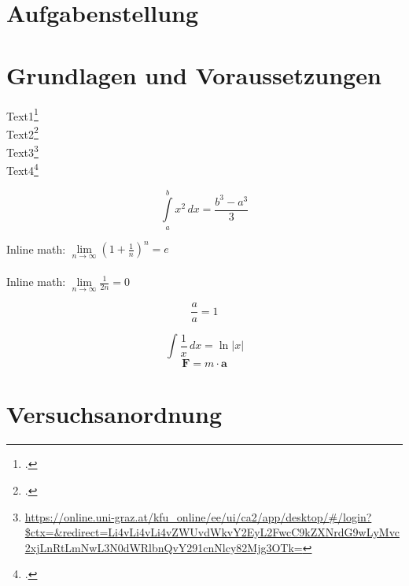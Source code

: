 \documentclass[11pt, DIV=8, ngerman]{scrartcl}
\begin{document}


\clearpage
\tableofcontents
\newpage

\section{Aufgabenstellung}
\label{sec:aufgabenstellung}



\section{Grundlagen und Voraussetzungen}
\label{sec:grundlagen_voraussetzungen}

Text1\footcite[1000]{ref:dem1} \\
Text2\footcite[Kapitel 74]{ref:knoll} \\
Text3\footnote{\url{https://online.uni-graz.at/kfu_online/ee/ui/ca2/app/desktop/\#/login?$ctx=&redirect=Li4vLi4vLi4vZWUvdWkvY2EyL2FwcC9kZXNrdG9wLyMvc2xjLnRtLmNwL3N0dWRlbnQvY291cnNlcy82Mjg3OTk=}} \\  %
Text4\footcite{ref:genol2013}

\begin{equation}
\label{eq:grenzen-oben-unten}
    \int \limits_{a}^{b} x^2 \, dx =\frac{b^3-a^3}{3}  %
\end{equation}

Inline math: \(\lim \limits_{n \to \infty} \left( 1 + \frac{1}{n} \right) ^{n} = e\)  \\ \\ %
Inline math: $\lim \limits_{n \to \infty} \frac{1}{2n} = 0$  %

\begin{displaymath}
    \frac{a}{a} = 1
\end{displaymath}

\[ \int \frac{1}{x} \, dx = \ln|x| \]  %
$$ \textbf{F} = m \cdot \textbf{a} $$  %



\section{Versuchsanordnung}
\label{sec:versuchsanordnung}
\end{document}
